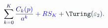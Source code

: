 \documentclass[12pt]{article}
\begin{document}
\makeatletter
\renewcommand*{\@textcolor}[3]{%
  \protect\leavevmode
  \begingroup
    \color#1{#2}#3%
  \endgroup
}
\makeatother
\begin{displaymath}
\mathcolor[RGB]{0,0,15}{\sum} _ { \mathcolor[RGB]{0,0,30}{k} \mathcolor[RGB]{0,0,45}{=} \mathcolor[RGB]{0,0,60}{0} } ^ { \mathcolor[RGB]{0,0,75}{K} } \mathcolor[RGB]{0,0,90}{\frac { \mathcolor[RGB]{0,0,105}{C} _ { \mathcolor[RGB]{0,0,120}{k} } \mathcolor[RGB]{0,0,135}{(} \mathcolor[RGB]{0,0,150}{p} \mathcolor[RGB]{0,0,165}{)} } { \mathcolor[RGB]{0,0,180}{a} ^ { \mathcolor[RGB]{0,0,195}{k} } } } \mathcolor[RGB]{0,0,210}{+} \mathcolor[RGB]{0,0,225}{R} \mathcolor[RGB]{0,0,240}{S} _ { \mathcolor[RGB]{0,0,255}{K} } \mathcolor[RGB]{0,15,0}{+} \mathcolor[RGB]{0,15,15}{\Turing} \mathcolor[RGB]{0,15,30}{(} \mathcolor[RGB]{0,15,45}{\varepsilon} _ { \mathcolor[RGB]{0,15,60}{2} } \mathcolor[RGB]{0,15,75}{)} \mathcolor[RGB]{0,15,90}{.}
\end{displaymath}
\end{document}
